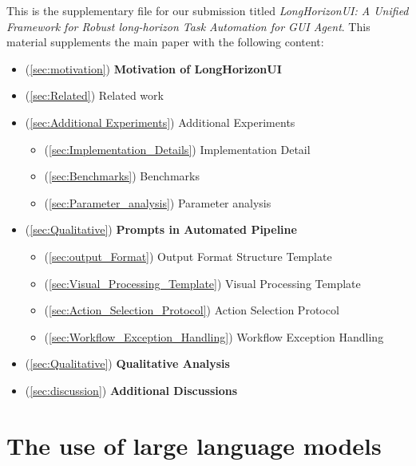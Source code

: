 \documentclass{article} %
\begin{document}
This is the supplementary file for our submission titled \textit{LongHorizonUI: A Unified Framework for Robust long-horizon Task Automation for GUI Agent}. This material supplements the main paper with the following content:
\vspace{0.3cm}
\begin{itemize}
   \item (\ref{sec:motivation}) \textbf{Motivation of LongHorizonUI}
     \item (\ref{sec:Related}) Related work
    \item (\ref{sec:Additional Experiments}) Additional Experiments
    \begin{itemize}
        \item (\ref{sec:Implementation_Details}) Implementation Detail
        \item (\ref{sec:Benchmarks}) Benchmarks
        \item (\ref{sec:Parameter_analysis}) Parameter analysis
    \end{itemize}
    \item (\ref{sec:Qualitative}) \textbf{Prompts in Automated Pipeline}
       \begin{itemize}
        \item (\ref{sec:output_Format}) Output Format Structure Template
        \item (\ref{sec:Visual_Processing_Template}) Visual Processing Template
        \item (\ref{sec:Action_Selection_Protocol}) Action Selection Protocol
        \item (\ref{sec:Workflow_Exception_Handling}) Workflow Exception Handling
    \end{itemize}

    \item (\ref{sec:Qualitative}) \textbf{Qualitative Analysis}

    \item (\ref{sec:discussion}) \textbf{Additional Discussions}
\end{itemize}

\section{The use of large language models}
\label{sec:LLM}
\end{document}
